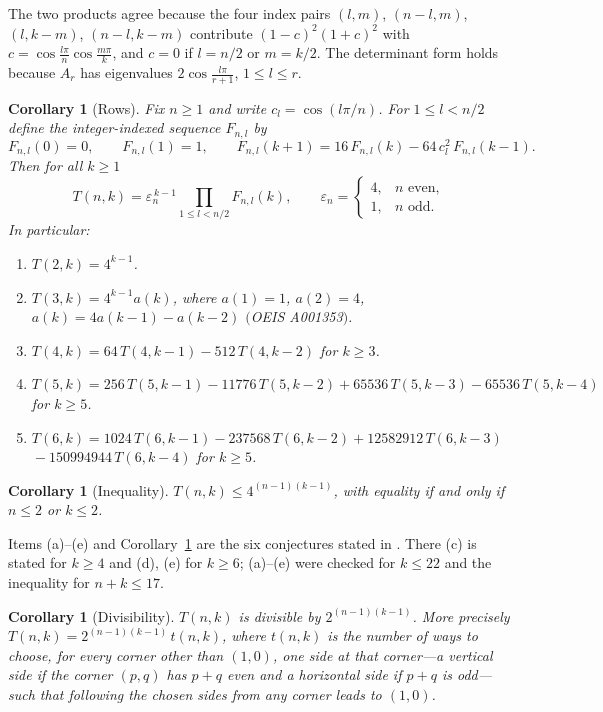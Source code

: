 \documentclass[11pt,a4paper]{amsart}
\newtheorem{corollary}[theorem]{Corollary}
\theoremstyle{remark}
\begin{document}
The two products agree because the four index pairs $(l,m)$, $(n-l,m)$, $(l,k-m)$, $(n-l,k-m)$ contribute
$(1-c)^2(1+c)^2$ with $c=\cos\frac{l\pi}n\cos\frac{m\pi}k$, and $c=0$ if $l=n/2$ or $m=k/2$. The determinant
form holds because $A_r$ has eigenvalues $2\cos\frac{l\pi}{r+1}$, $1\le l\le r$.

\begin{corollary}[Rows]\label{cor:rows}
Fix $n\ge 1$ and write $c_l=\cos(l\pi/n)$. For $1\le l<n/2$ define the integer-indexed sequence $F_{n,l}$ by
\[ F_{n,l}(0)=0,\qquad F_{n,l}(1)=1,\qquad F_{n,l}(k+1)=16\,F_{n,l}(k)-64\,c_l^{2}\,F_{n,l}(k-1). \]
Then for all $k\ge1$
\[ T(n,k)=\varepsilon_n^{\,k-1}\prod_{1\le l<n/2}F_{n,l}(k),\qquad \varepsilon_n=\begin{cases}4,& n \text{ even},\\ 1,& n\text{ odd}.\end{cases}\]
In particular:
\begin{enumerate}
\item[(a)] $T(2,k)=4^{k-1}$.
\item[(b)] $T(3,k)=4^{k-1}a(k)$, where $a(1)=1$, $a(2)=4$, $a(k)=4a(k-1)-a(k-2)$ $($OEIS A001353$)$.
\item[(c)] $T(4,k)=64\,T(4,k-1)-512\,T(4,k-2)$ for $k\ge 3$.
\item[(d)] $T(5,k)=256\,T(5,k-1)-11776\,T(5,k-2)+65536\,T(5,k-3)-65536\,T(5,k-4)$ for $k\ge 5$.
\item[(e)] $T(6,k)=1024\,T(6,k-1)-237568\,T(6,k-2)+12582912\,T(6,k-3)$\\
\hspace*{4.2em}${}-150994944\,T(6,k-4)$ for $k\ge5$.
\end{enumerate}
\end{corollary}

\begin{corollary}[Inequality]\label{cor:ineq}
$T(n,k)\le 4^{(n-1)(k-1)}$, with equality if and only if $n\le 2$ or $k\le 2$.
\end{corollary}

Items (a)--(e) and Corollary~\ref{cor:ineq} are the six conjectures stated in \cite{OEIS}. There (c) is stated
for $k\ge4$ and (d), (e) for $k\ge 6$; (a)--(e) were checked for $k\le 22$ and the inequality for $n+k\le 17$.

\begin{corollary}[Divisibility]\label{cor:div}
$T(n,k)$ is divisible by $2^{(n-1)(k-1)}$. More precisely $T(n,k)=2^{(n-1)(k-1)}\,t(n,k)$, where $t(n,k)$ is the
number of ways to choose, for every corner other than $(1,0)$, one side at that corner---a vertical side if the
corner $(p,q)$ has $p+q$ even and a horizontal side if $p+q$ is odd---such that following the chosen sides from any
corner leads to $(1,0)$.
\end{corollary}
\end{document}
